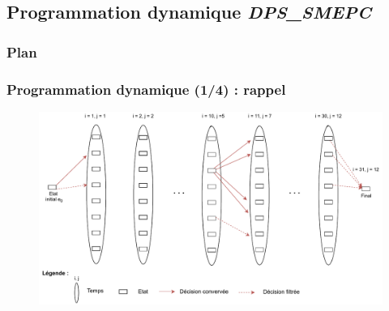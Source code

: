 \documentclass[hyperref={bookmarks=false},aspectratio=169]{beamer}
\begin{document}
\subsection{Programmation dynamique \textbf{\textit{DPS\_SMEPC}}}
\begin{frame}
\frametitle{Plan}
\addtocounter{framenumber}{-1}
\end{frame}

\begin{frame}
	\frametitle{Programmation dynamique (1/4) : rappel}
 \begin{figure}
	\centering
   \includegraphics[width=\textwidth]{./figures/slide_Fr_Structure_G.pdf}
	\label{Structure_G}
\end{figure}
 \end{frame}
\end{document}
